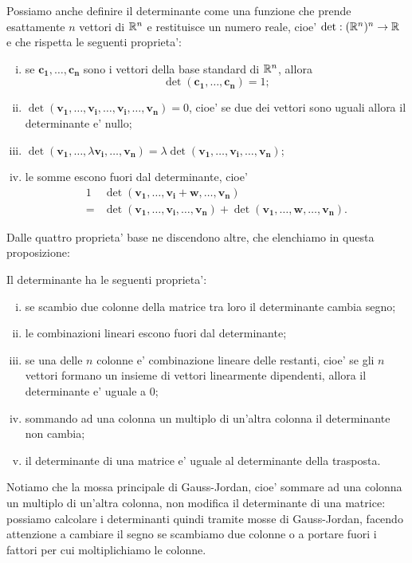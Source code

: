 Possiamo anche definire il determinante come una funzione che prende esattamente $n$ vettori di $\mathbb{R}^n$ e restituisce un numero reale, cioe' $\det : (\mathbb{R}^n)^n \to \mathbb{R}$ e che rispetta le seguenti proprieta':
\begin{enumerate}
    [(i)]
    \item se $\bm{c_1}, \dots, \bm{c_n}$ sono i vettori della base standard di $\mathbb{R}^n$, allora \[\det(\bm{c_1}, \dots, \bm{c_n}) = 1;\]
    \item $\det(\bm{v_1}, \dots, \bm{v_i}, \dots, \bm{v_i}, \dots, \bm{v_n}) = 0$, cioe' se due dei vettori sono uguali allora il determinante e' nullo;
    \item $\det(\bm{v_1}, \dots, \lambda\bm{v_i}, \dots, \bm{v_n}) = \lambda \det (\bm{v_1}, \dots, \bm{v_i}, \dots, \bm{v_n})$;
    \item le somme escono fuori dal determinante, cioe' \begin{alignat*}{1}
        &\det(\bm{v_1}, \dots, \bm{v_i} + \bm{w}, \dots, \bm{v_n})\\
        = &\det (\bm{v_1}, \dots, \bm{v_i}, \dots, \bm{v_n}) + \det (\bm{v_1}, \dots, \bm{w}, \dots, \bm{v_n}).
    \end{alignat*}
\end{enumerate}

Dalle quattro proprieta' base ne discendono altre, che elenchiamo in questa proposizione:
\begin{proposition}
    Il determinante ha le seguenti proprieta':
    \begin{enumerate}
        [(i)]
        \item se scambio due colonne della matrice tra loro il determinante cambia segno;
        \item le combinazioni lineari escono fuori dal determinante;
        \item se una delle $n$ colonne e' combinazione lineare delle restanti, cioe' se gli $n$ vettori formano un insieme di vettori linearmente dipendenti, allora il determinante e' uguale a $0$;
        \item sommando ad una colonna un multiplo di un'altra colonna il determinante non cambia;
        \item il determinante di una matrice e' uguale al determinante della trasposta.
    \end{enumerate}
\end{proposition}

Notiamo che la mossa principale di Gauss-Jordan, cioe' sommare ad una colonna un multiplo di un'altra colonna, non modifica il determinante di una matrice: possiamo calcolare i determinanti quindi tramite mosse di Gauss-Jordan, facendo attenzione a cambiare il segno se scambiamo due colonne o a portare fuori i fattori per cui moltiplichiamo le colonne.

